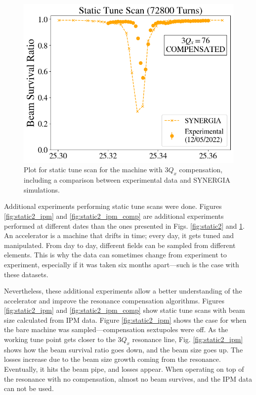 \begin{figure}[H]
    \centering
    \includegraphics[width=\columnwidth]{chapter4/static2turns_comp.png}
    \caption{Plot for static tune scan for the machine with $3Q_x$ compensation, including a comparison between experimental data and SYNERGIA simulations.}
    \label{fig:static2_comp}
\end{figure}

Additional experiments performing static tune scans were done. Figures \ref{fig:static2_ipm} and \ref{fig:static2_ipm_comp} are additional experiments performed at different dates than the ones presented in Figs. \ref{fig:static2} and \ref{fig:static2_comp}. An accelerator is a machine that drifts in time; every day, it gets tuned and manipulated. From day to day, different fields can be sampled from different elements. This is why the data can sometimes change from experiment to experiment, especially if it was taken six months apart---such is the case with these datasets. 

Nevertheless, these additional experiments allow a better understanding of the accelerator and improve the resonance compensation algorithms. Figures \ref{fig:static2_ipm} and \ref{fig:static2_ipm_comp} show static tune scans with beam size calculated from IPM data. Figure \ref{fig:static2_ipm} shows the case for when the bare machine was sampled---compensation sextupoles were off. As the working tune point gets closer to the $3Q_x$ resonance line, Fig. \ref{fig:static2_ipm} shows how the beam survival ratio goes down, and the beam size goes up. The losses increase due to the beam size growth coming from the resonance. Eventually, it hits the beam pipe, and losses appear. When operating on top of the resonance with no compensation, almost no beam survives, and the IPM data can not be used. 

